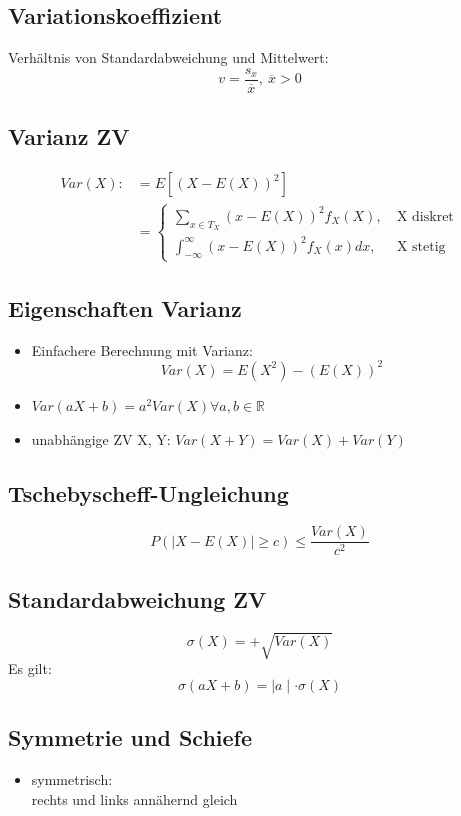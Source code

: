 \documentclass[10pt,a4paper,landscape]{article}
\begin{document}
\begin{multicols}{4}
\subsection{Variationskoeffizient}
Verhältnis von Standardabweichung und Mittelwert:
\[
v = \frac{s_x}{\overline{x}}, ~\overline{x}>0
\]

\subsection{Varianz ZV}
\begin{align*}
Var(X) :&= E[(X-E(X))^2] \\
&= \begin{cases}
\sum_{x \in T_X}(x-E(X))^2f_X(X), &~\text{X diskret} \\
\int_{-\infty}^{\infty}(x-E(X))^2f_X(x)dx, &~\text{X stetig}
\end{cases}
\end{align*}

\subsection*{Eigenschaften Varianz}
\begin{itemize}
\item Einfachere Berechnung mit Varianz:
\[
Var(X)=E(X^2)-(E(X))^2
\]
\item $Var(aX+b)=a^2Var(X) \forall a,b \in \mathbb{R}$
\item unabhängige ZV X, Y: $Var(X+Y)=Var(X)+Var(Y)$
\end{itemize}

\subsection{Tschebyscheff-Ungleichung}
\[
P(\mid X-E(X)\mid \geq c) \leq \frac{Var(X)}{c^2}
\]

\subsection{Standardabweichung ZV}
\[
\sigma (X)=+ \sqrt{Var(X)}
\]
Es gilt:
\[
\sigma (aX + b) = \mid a \mid \cdot \sigma (X)
\]

\subsection{Symmetrie und Schiefe}
\begin{itemize}
\item symmetrisch: \\
rechts und links annähernd gleich


\end{itemize}
\end{multicols}
\end{document}
